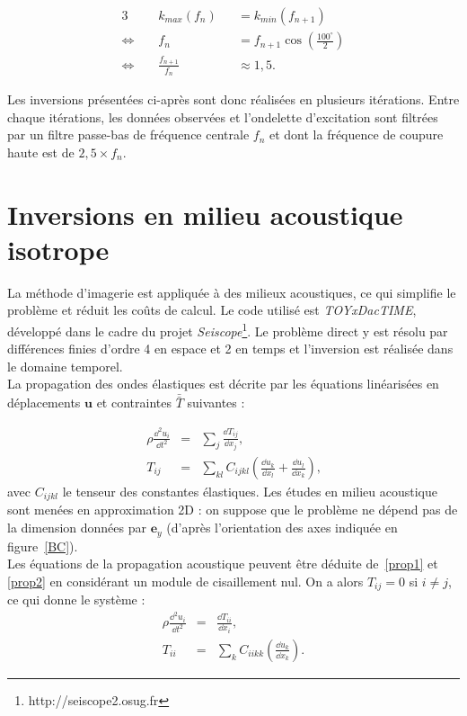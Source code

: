 \begin{alignat*}{3}
	  ~&k_{max}(f_{n}) &&= k_{min}(f_{n+1})\\
	\Leftrightarrow~~~~~ &  f_n &&= f_{n+1}\cos \left(\frac{100^\circ}{2} \right)\\
	 \Leftrightarrow~~~~~ & \frac{f_{n+1}}{f_n} && \approx  1,5.
\end{alignat*} 

Les inversions présentées ci-après sont donc réalisées en plusieurs itérations. Entre chaque itérations, les données observées et l'ondelette d'excitation sont filtrées par un filtre passe-bas de fréquence centrale $f_{n}$ et dont la fréquence de coupure haute est de $2,5 \times f_{n}$.


\section{Inversions en milieu acoustique isotrope}

La méthode d'imagerie est appliquée à des milieux acoustiques, ce qui simplifie le problème et réduit les coûts de calcul. Le code utilisé est \emph{TOYxDacTIME}, développé dans le cadre du projet \emph{Seiscope}\footnote{http://seiscope2.osug.fr}. Le problème direct y est résolu par différences finies d'ordre 4 en espace et 2 en temps et l'inversion est réalisée dans le domaine temporel.\\

La propagation des ondes élastiques est décrite par les équations linéarisées en déplacements $\bm{u}$ et contraintes $\bar{\bar T}$ suivantes \citep{mat_ac2} : 

\begin{eqnarray}
	\rho \frac{\dd^2 u_{i}}{\dd t^2} &=& \displaystyle\sum_{j}\frac{\dd T_{ij}}{\dd x_{j}}\text{,}	\label{prop1}\\
	T_{ij}&=&\displaystyle\sum_{kl}C_{ijkl}\left( \frac{\dd u_{k}}{\dd x_{l}} + \frac{\dd u_{l}}{\dd x_{k}}\right)\text{,}	\label{prop2}
\end{eqnarray}
avec $C_{ijkl}$ le tenseur des constantes élastiques. Les études en milieu acoustique sont menées en approximation 2D : on suppose que le problème ne dépend pas de la dimension données par $\bm{e}_{y}$ (d'après l'orientation des axes indiquée en figure~\ref{BC}).\\

Les équations de la propagation acoustique peuvent être déduite de~\ref{prop1} et \ref{prop2} en considérant un module de cisaillement nul. On a alors $T_{ij}=0$ si $i\neq j$, ce qui donne le système :
\begin{eqnarray}
	\rho \frac{\dd^2 u_{i}}{\dd t^2} &=& \frac{\dd T_{ii}}{\dd x_{i}}\text{,}\\
	T_{ii} &=& \displaystyle\sum_{k}C_{iikk}\left( \frac{\dd u_{k}}{\dd x_{k}}\right)	.
\end{eqnarray}


